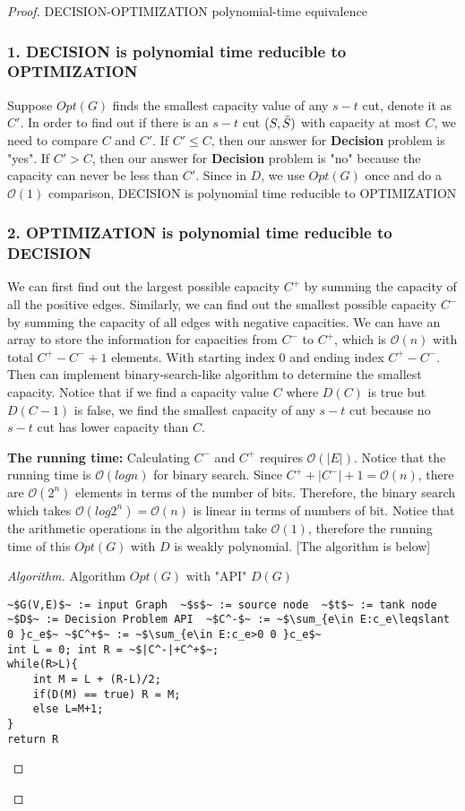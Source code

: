 \documentclass[openany]{article}
\begin{document}
\begin{proof}{}{DECISION-OPTIMIZATION polynomial-time equivalence}
    \subsubsection*{1. DECISION is polynomial time reducible to OPTIMIZATION}

Suppose $Opt(G)$ finds the smallest capacity value of any $s-t$ cut, denote it as $C'$. In order to find out if there is an $s-t$ cut $(S, \Bar{S})$ with capacity at most $C$, we need to compare $C$ and $C'$. If $C' \leqslant C$, then our answer for \textbf{Decision} problem is "yes". If $C' > C$, then our answer for \textbf{Decision} problem is "no" because the capacity can never be less than $C'$. Since in $D$, we use $Opt(G)$ once and do a $\mathcal{O}(1)$ comparison, DECISION is polynomial time reducible to OPTIMIZATION 

\subsubsection*{2. OPTIMIZATION is polynomial time reducible to DECISION}
  
We can first find out the largest possible capacity $C^+$ by summing the capacity of all the positive edges. Similarly, we can find out the smallest possible capacity $C^-$ by summing the capacity of all edges with negative capacities. We can have an array to store the information for capacities from $C^-$ to $C^+$, which is $\mathcal{O}(n)$ with total $C^+-C^-+1$ elements. With starting index $0$ and ending index $C^+-C^-$. Then can implement binary-search-like algorithm to determine the smallest capacity. Notice that if we find a capacity value $C$ where $D(C)$ is true but $D(C-1)$ is false, we find the smallest capacity of any $s-t$ cut because no $s-t$ cut has lower capacity than $C$. 

\textbf{The running time:} Calculating $C^-$ and $C^+$ requires $\mathcal{O}(|E|)$. Notice that the running time is $\mathcal{O}(log n)$ for binary search. Since $C^++|C^-|+1 = \mathcal{O}(n)$, there are $\mathcal{O}(2^n)$ elements in terms of the number of bits. Therefore, the binary search which takes $\mathcal{O}(log{2^n}) = \mathcal{O}(n)$ is linear in terms of numbers of bit. Notice that the arithmetic operations in the algorithm take $\mathcal{O}(1)$, therefore the running time of this $Opt(G)$ with $D$ is weakly polynomial. [The algorithm is below]

\begin{proof}[Algorithm]{}
		\renewcommand{\qedsymbol}{}
		Algorithm $Opt(G)$ with "API" $D(G)$
		\begin{lstlisting}[basicstyle=\fontsize{8}{9}\selectfont\ttfamily]
~$G(V,E)$~ := input Graph  ~$s$~ := source node  ~$t$~ := tank node
~$D$~ := Decision Problem API  ~$C^-$~ := ~$\sum_{e\in E:c_e\leqslant 0 }c_e$~ ~$C^+$~ := ~$\sum_{e\in E:c_e>0 0 }c_e$~
int L = 0; int R = ~$|C^-|+C^+$~;
while(R>L){
    int M = L + (R-L)/2;
    if(D(M) == true) R = M;
    else L=M+1;
}
return R
		\end{lstlisting} 
\end{proof}


\end{proof}
\end{document}
